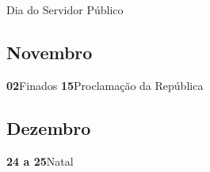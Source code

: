 \documentclass[thesis]{hmcposter}
\begin{document}
\begin{poster}
\quad \quad \quad Dia do Servidor Público \newline\subsection{Novembro}\textbf{02}\quad \quad \quad \quad Finados \newline\textbf{15}\quad \quad \quad \quad Proclamação da República \newline\subsection{Dezembro}\textbf{24 a 25}\quad \quad Natal \newline\end{poster}
\end{document}
